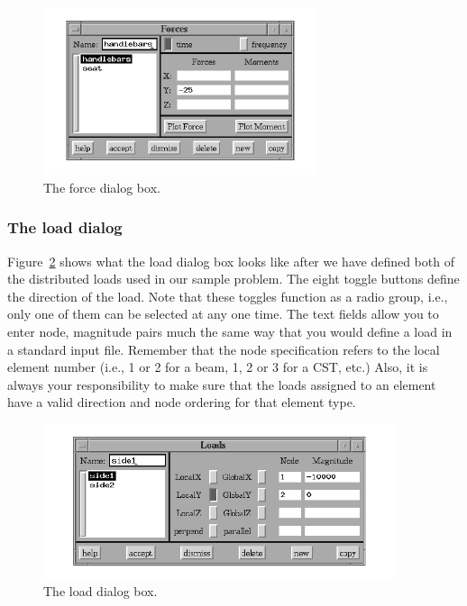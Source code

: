 \begin{figure}
\begin{center}
 \includegraphics[width=3.16in]{figures/velvet_force}
\end{center}
\caption{The force dialog box.}
\label{velvet.force}
\end{figure}

\subsubsection{The load dialog}

Figure~\ref{velvet.load} shows what the load dialog box looks like after
we have defined both of the distributed loads used in our sample problem.
The eight toggle buttons define the direction of the load.  Note that these
toggles function as a radio group, i.e., only one of them can be
selected at any one time.  The text fields allow you to enter
node, magnitude pairs much the same way that you would define a load in a
standard \felt{} input file. Remember that the node specification refers
to the local element number (i.e., 1 or 2 for a beam, 1, 2 or 3 for a CST, 
etc.)  Also, it is always your responsibility to make sure that 
the loads assigned to an element have a valid direction and node ordering
for that element type.

\begin{figure}
\begin{center}
 \includegraphics[width=4.06in]{figures/velvet_load}
\end{center}
\caption{The load dialog box.}
\label{velvet.load}
\end{figure}

